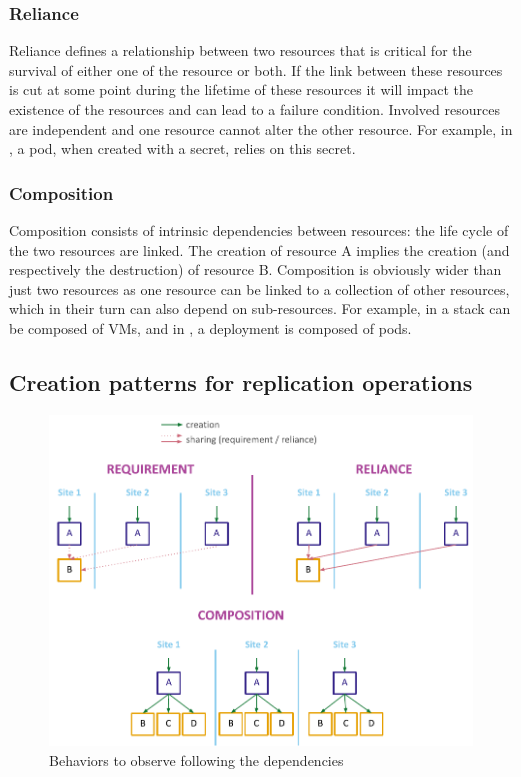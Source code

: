 \vspace{-15pt}
\subsubsection{Reliance}

Reliance defines a relationship between two resources that is critical
for the survival of either one of the resource or both.
%
If the link between these resources is cut at some point during the
lifetime of these resources it will impact the existence of the
resources and can lead to a failure condition.
%
Involved resources are independent and one resource cannot alter the
other resource.
%
For example, in \ks, a pod, when created with a secret, relies on this
secret.

\vspace{-15pt}
\subsubsection{Composition}
Composition consists of intrinsic dependencies between resources: the
life cycle of the two resources are linked.
%
The creation of resource A implies the creation (and respectively the
destruction) of resource B.
%
Composition is obviously wider than just two resources as one resource
can be linked to a collection of other resources, which in their turn
can also depend on sub-resources.
%
For example, in \os a stack can be composed of VMs, and in \ks, a
deployment is composed of pods.


\subsection{Creation patterns for replication operations}

\begin{figure}[htbp]
  \centering
  \includegraphics[width=0.76\linewidth]{figs/pdf/behaviors.pdf}
  \caption{Behaviors to observe following the dependencies}
  \label{fig:patterns}
\end{figure}


